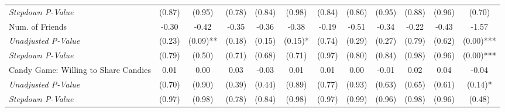 \begin{tabular}{l c c c c c c c c c c c}
\quad \textit{Stepdown P-Value} & (0.87) & (0.95) & (0.78) & (0.84) & (0.98) & (0.84) & (0.86) & (0.95) & (0.88) & (0.96) & (0.70) \\
Num. of Friends & -0.30 & -0.42 & -0.35 & -0.36 & -0.38 & -0.19 & -0.51 & -0.34 & -0.22 & -0.43 & -1.57 \\
\quad \textit{Unadjusted P-Value} & (0.23) & (0.09)** & (0.18) & (0.15) & (0.15)* & (0.74) & (0.29) & (0.27) & (0.79) & (0.62) & (0.00)*** \\
\quad \textit{Stepdown P-Value} & (0.79) & (0.50) & (0.71) & (0.68) & (0.71) & (0.97) & (0.80) & (0.84) & (0.98) & (0.96) & (0.00)*** \\
Candy Game: Willing to Share Candies & 0.01 & 0.00 & 0.03 & -0.03 & 0.01 & 0.01 & 0.00 & -0.01 & 0.02 & 0.04 & -0.04 \\
\quad \textit{Unadjusted P-Value} & (0.70) & (0.90) & (0.39) & (0.44) & (0.89) & (0.77) & (0.93) & (0.63) & (0.65) & (0.61) & (0.14)* \\
\quad \textit{Stepdown P-Value} & (0.97) & (0.98) & (0.78) & (0.84) & (0.98) & (0.97) & (0.99) & (0.96) & (0.98) & (0.96) & (0.48) \\
\bottomrule
\end{tabular}

